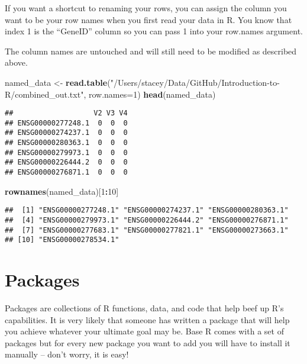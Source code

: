 \documentclass[]{article}
\newenvironment{Shaded}{\begin{snugshade}}{\end{snugshade}}
\newcommand{\KeywordTok}[1]{\textcolor[rgb]{0.13,0.29,0.53}{\textbf{#1}}}
\newcommand{\DataTypeTok}[1]{\textcolor[rgb]{0.13,0.29,0.53}{#1}}
\newcommand{\DecValTok}[1]{\textcolor[rgb]{0.00,0.00,0.81}{#1}}
\newcommand{\StringTok}[1]{\textcolor[rgb]{0.31,0.60,0.02}{#1}}
\newcommand{\OperatorTok}[1]{\textcolor[rgb]{0.81,0.36,0.00}{\textbf{#1}}}
\newcommand{\NormalTok}[1]{#1}
\begin{document}
If you want a shortcut to renaming your rows, you can assign the column
you want to be your row names when you first read your data in R. You
know that index 1 is the ``GeneID'' column so you can pass 1 into your
row.names argument.

The column names are untouched and will still need to be modified as
described above.

\begin{Shaded}
\begin{Highlighting}[]
\NormalTok{named_data <-}\StringTok{ }\KeywordTok{read.table}\NormalTok{(}\StringTok{"/Users/stacey/Data/GitHub/Introduction-to-R/combined_out.txt"}\NormalTok{,}
                         \DataTypeTok{row.names=}\DecValTok{1}\NormalTok{)}
\KeywordTok{head}\NormalTok{(named_data)}
\end{Highlighting}
\end{Shaded}

\begin{verbatim}
##                   V2 V3 V4
## ENSG00000277248.1  0  0  0
## ENSG00000274237.1  0  0  0
## ENSG00000280363.1  0  0  0
## ENSG00000279973.1  0  0  0
## ENSG00000226444.2  0  0  0
## ENSG00000276871.1  0  0  0
\end{verbatim}

\begin{Shaded}
\begin{Highlighting}[]
\KeywordTok{rownames}\NormalTok{(named_data)[}\DecValTok{1}\OperatorTok{:}\DecValTok{10}\NormalTok{]}
\end{Highlighting}
\end{Shaded}

\begin{verbatim}
##  [1] "ENSG00000277248.1" "ENSG00000274237.1" "ENSG00000280363.1"
##  [4] "ENSG00000279973.1" "ENSG00000226444.2" "ENSG00000276871.1"
##  [7] "ENSG00000277683.1" "ENSG00000277821.1" "ENSG00000273663.1"
## [10] "ENSG00000278534.1"
\end{verbatim}

\section{Packages}\label{packages}

Packages are collections of R functions, data, and code that help beef
up R's capabilities. It is very likely that someone has written a
package that will help you achieve whatever your ultimate goal may be.
Base R comes with a set of packages but for every new package you want
to add you will have to install it manually -- don't worry, it is easy!
\end{document}
